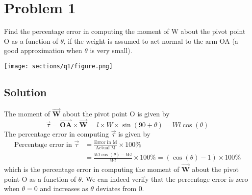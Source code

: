 \section*{Problem 1}

Find the percentage error in computing the moment of W about the pivot point O as a function of \( \theta \), if the weight is assumed to act normal to the arm OA (a good approximation when \( \theta \) is very small).

\begin{figure*}[h]
    \centering
    \texttt{[image: sections/q1/figure.png]}
\end{figure*}

\subsection*{Solution}

The moment of \( \vec{\mathbf{W}} \) about the pivot point O is given by
\[
    \vec{\tau} = \vec{\mathbf{OA}} \times \vec{\mathbf{W}}
    = l \times W \times \sin(90 + \theta)
    = W l \cos(\theta)
\]
The percentage error in computing \( \vec{\tau} \) is given by
\begin{align*}
    \text{Percentage error in } \vec{\tau}
     & =
    \frac{\text{Error in M}}{\text{Actual M}} \times 100\% \\
     & = \frac{W l \cos(\theta) - W l}{W l} \times 100\%
    = (\cos(\theta) - 1) \times 100\%
\end{align*}
which is the percentage error in computing the moment of \( \vec{\mathbf{W}} \) about the pivot point O as a function of \( \theta \).
We can indeed verify that the percentage error is zero when \( \theta = 0 \) and increases as \( \theta \) deviates from 0.
